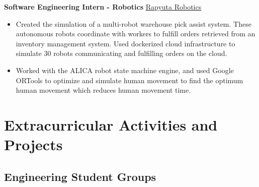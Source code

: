 \documentclass[11pt, a4paper]{cv}
\begin{document}
	\textbf{Software Engineering Intern - Robotics} \hfill \href{https://www.rapyuta-robotics.com}{Rapyuta Robotics}
	\begin{itemize}
		\item Created the simulation of a multi-robot warehouse pick assist system. These autonomous robots coordinate with workers to fulfill orders retrieved from an inventory management system. Used dockerized cloud infrastructure to simulate 30 robots communicating and fulfilling orders on the cloud.
		\item Worked with the ALICA robot state machine engine, and used Google ORTools to optimize and simulate human movement to find the optimum human movement which reduces human movement time.
	\end{itemize}

%
\pagebreak
\section*{Extracurricular Activities and Projects}

\subsection*{Engineering Student Groups}\noindent
\end{document}
